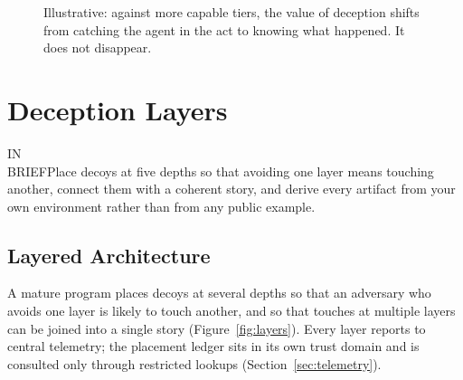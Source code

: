 \documentclass[11pt,letterpaper]{article}
\newcommand{\inbrief}[1]{\begin{inbriefbox}IN\\BRIEF\tcblower #1\end{inbriefbox}}
\begin{document}
\begin{figure}[htbp]
\centering
{}
\caption{Illustrative: against more capable tiers, the value of deception shifts from catching the agent in the act to knowing what happened. It does not disappear.}
\label{fig:tiers}
\end{figure}

\section{Deception Layers}
\label{sec:layers}

\inbrief{Place decoys at five depths so that avoiding one layer means touching another, connect them with a coherent story, and derive every artifact from your own environment rather than from any public example.}

\subsection{Layered Architecture}
\label{sec:architecture}

A mature program places decoys at several depths so that an adversary who avoids one layer is likely to touch another, and so that touches at multiple layers can be joined into a single story (Figure~\ref{fig:layers}). Every layer reports to central telemetry; the placement ledger sits in its own trust domain and is consulted only through restricted lookups (Section~\ref{sec:telemetry}).
\end{document}
